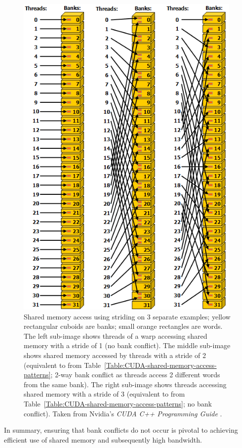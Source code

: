 \begin{figure}[h!]
	\centering
	\includegraphics[width=11cm, keepaspectratio]{images/ch1/CUDA_shared_memory_banks_words_conflicts.png}
	\caption{Shared memory access using striding on 3 separate examples; yellow rectangular cuboids are banks; small orange rectangles are words. The left sub-image shows threads of a warp accessing shared memory with a stride of 1 (no bank conflict). The middle sub-image shows shared memory accessed by threads with a stride of 2 (equivalent to  from Table~\ref{Table:CUDA-shared-memory-access-patterns}; 2-way bank conflict as threads access 2 different words from the same bank). The right sub-image shows threads accessing shared memory with a stride of 3 (equivalent to  from Table~\ref{Table:CUDA-shared-memory-access-patterns}; no bank conflict). Taken from Nvidia's \emph{CUDA C++ Programming Guide} \cite{NVIDIAMay2022}.}
	\label{Figure:CUDA-shared-memory-banks-words-conflicts}
\end{figure}

In summary, ensuring that bank conflicts do not occur is pivotal to achieving efficient use of shared memory and subsequently high bandwidth.

